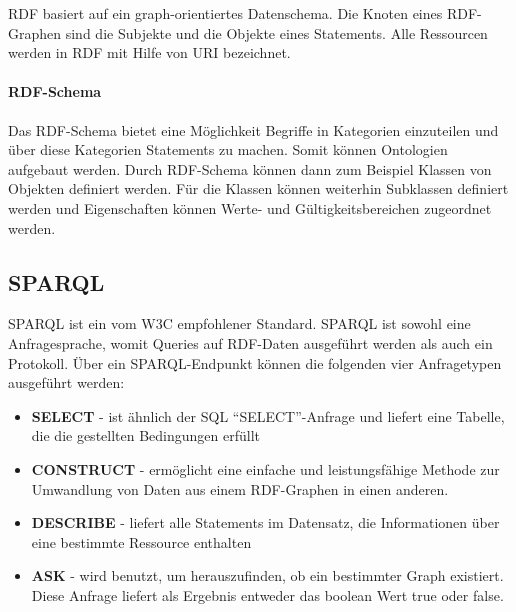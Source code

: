 \ac{RDF} basiert auf ein graph-orientiertes Datenschema.
Die Knoten eines RDF-Graphen sind die Subjekte und die Objekte eines Statements.
Alle Ressourcen werden in RDF mit Hilfe von \ac{URI} bezeichnet.

\paragraph{RDF-Schema} 

Das RDF-Schema bietet eine Möglichkeit Begriffe in Kategorien einzuteilen und über diese Kategorien Statements zu machen.
Somit können Ontologien aufgebaut werden.
Durch RDF-Schema können dann zum Beispiel Klassen von Objekten definiert werden.
Für die Klassen können weiterhin Subklassen definiert werden und Eigenschaften können Werte- und Gültigkeitsbereichen zugeordnet werden. \citep[vgl.]{pellegrinix}

\subsection{SPARQL} 

\ac{SPARQL} ist ein vom W3C empfohlener Standard.
\ac{SPARQL} ist sowohl eine Anfragesprache, womit Queries auf RDF-Daten ausgeführt werden als auch ein Protokoll. \citep[vgl.]{hitzler}
Über ein \ac{SPARQL}-Endpunkt können die folgenden vier Anfragetypen ausgeführt werden:

\begin{itemize}
\item \textbf{SELECT} - ist ähnlich der SQL \enquote{SELECT}-Anfrage und liefert eine Tabelle, die die gestellten Bedingungen erfüllt
\item \textbf{CONSTRUCT} - ermöglicht eine einfache und leistungsfähige Methode zur Umwandlung von Daten aus einem RDF-Graphen in einen anderen.
\item \textbf{DESCRIBE} - liefert alle Statements im Datensatz, die Informationen über eine bestimmte Ressource enthalten
\item \textbf{ASK} - wird benutzt, um herauszufinden, ob ein bestimmter Graph existiert. Diese Anfrage liefert als Ergebnis entweder das boolean Wert true oder false. \citep[vgl.]{hebeler_semantic_2009}
\end{itemize}






